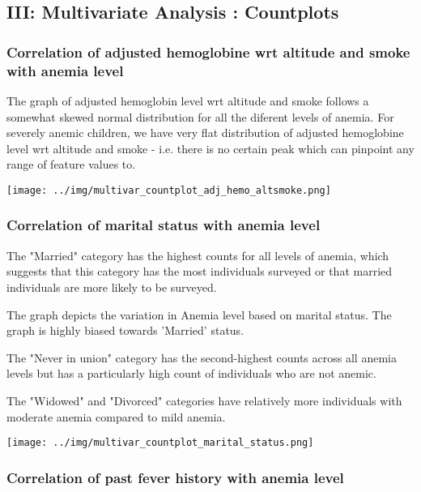 \subsection{III: Multivariate Analysis : Countplots}

\subsubsection{Correlation of adjusted hemoglobine wrt altitude and smoke with anemia level}


The graph of adjusted hemoglobin level wrt altitude and smoke follows a somewhat skewed normal distribution for all the diferent levels of anemia. For severely anemic children, we have very flat distribution of adjusted hemoglobine level wrt altitude and smoke - i.e. there is no certain peak which can pinpoint any range of feature values to.

\texttt{[image: ../img/multivar\_countplot\_adj\_hemo\_altsmoke.png]}

\subsubsection{Correlation of marital status with anemia level}

The "Married" category has the highest counts for all levels of anemia, which suggests that this category has the most individuals surveyed or that married individuals are more likely to be surveyed.

The graph depicts the variation in Anemia level based on marital status. The graph is highly biased towards 'Married' status.

The "Never in union" category has the second-highest counts across all anemia levels but has a particularly high count of individuals who are not anemic.

The "Widowed" and "Divorced" categories have relatively more individuals with moderate anemia compared to mild anemia.

\texttt{[image: ../img/multivar\_countplot\_marital\_status.png]}

\subsubsection{Correlation of past fever history with anemia level}

